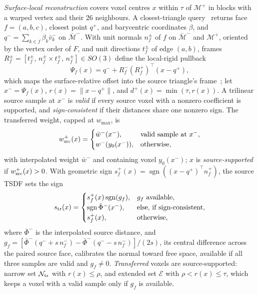 \emph{Surface-local reconstruction} covers voxel centres $x$ within
$\tau$ of $\mathcal M^+$ in blocks with a warped vertex and their 26
neighbours. A closest-triangle query~\cite{10.1145/2601097.2601199} returns face $f=(a,b,c)$, closest point $q^+$, and barycentric
coordinates $\beta$, and $q^-=\sum_{k\in f}\beta_k\bar v_k^-$ on $\bar{\mathcal M}^-$. With unit normals $n_f^\pm$ of $f$ on $\bar{\mathcal M}^-$ and
$\mathcal M^+$, oriented by the vertex order of $F$, and unit directions
$t_f^\pm$ of edge $(a,b)$, frames
$R_f^\pm=[t_f^\pm,\,n_f^\pm\times t_f^\pm,\,n_f^\pm]\in SO(3)$ define the
local-rigid pullback
\begin{equation}
\Psi_f(x)=q^-+R_f^-(R_f^+)^\top(x-q^+),
\label{eq:inverse_map}
\end{equation}
which maps the surface-relative offset into the source triangle's
frame~\cite{sumner2004deformationtransfer}; let $x^-=\Psi_f(x)$,
$r(x)=\|x-q^+\|$, and $d^+(x)=\min(\tau,r(x))$. A trilinear source sample at
$x^-$ is \emph{valid} if every source voxel with a nonzero coefficient is
supported, and \emph{sign-consistent} if their distances share one
nonzero sign. The transferred weight, capped at $w_{\max}$, is
\begin{equation}
w_{\rm src}^+(x)=\begin{cases}
\bar w^-(x^-), & \text{valid sample at } x^-,\\
w^-(y_0(x^-)), & \text{otherwise},
\end{cases}
\label{eq:source_weight}
\end{equation}
with interpolated weight $\bar w^-$ and containing voxel $y_0(x^-)$;
$x$ is \emph{source-supported} if $w_{\rm src}^+(x)>0$. With geometric sign
$s_f^+(x)=\operatorname{sgn}((x-q^+)^\top n_f^+)$, the source TSDF sets the
sign
\begin{equation}
s_{\rm tr}(x)=\begin{cases}
s_f^+(x)\operatorname{sgn}(g_f), & g_f\ \text{available},\\
\operatorname{sgn}\bar\Phi^-(x^-), & \text{else, if sign-consistent},\\
s_f^+(x), & \text{otherwise},
\end{cases}
\label{eq:sign}
\end{equation}
where $\bar\Phi^-$ is the interpolated source distance, and
$g_f=[\bar\Phi^-(q^-+s\,n_f^-)-\bar\Phi^-(q^--s\,n_f^-)]/(2s)$, its central
difference across the paired source face, calibrates the normal toward free
space, available if all three samples are valid and $g_f\neq0$.
\emph{Transferred} voxels are source-supported: narrow set
$\mathcal N_{\rm tr}$ with $r(x)\le\rho$, and extended set $\mathcal E$
with $\rho<r(x)\le\tau$, which keeps a voxel with a valid sample only if
$g_f$ is available.

